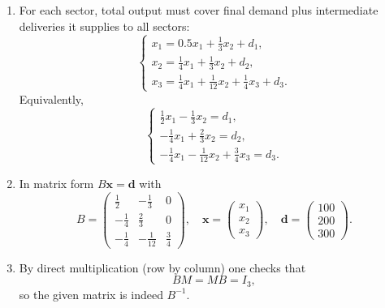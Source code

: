 \documentclass[11pt]{exam}
\begin{document}
\begin{questions}
\begin{solution}[0cm]
\begin{enumerate}[leftmargin = 0.5cm, label = (\alph*), rightmargin = 0.2cm]
    \item For each sector, total output must cover final demand plus intermediate deliveries it supplies to all sectors:
    \[
    \begin{cases}
        x_1 = 0.5x_1 + \tfrac{1}{3}x_2 + d_1, \\[4pt]
        x_2 = \tfrac{1}{4}x_1 + \tfrac{1}{3}x_2 + d_2, \\[4pt]
        x_3 = \tfrac{1}{4}x_1 + \tfrac{1}{12}x_2 + \tfrac{1}{4}x_3 + d_3.
    \end{cases}
    \]
    Equivalently,
    \[
    \begin{cases}
        \tfrac{1}{2}x_1 - \tfrac{1}{3}x_2 = d_1, \\[4pt]
        -\tfrac{1}{4}x_1 + \tfrac{2}{3}x_2 = d_2, \\[4pt]
        -\tfrac{1}{4}x_1 - \tfrac{1}{12}x_2 + \tfrac{3}{4}x_3 = d_3.
    \end{cases}
    \]

    \item In matrix form $B\mathbf{x} = \mathbf{d}$ with
    \[
        B =
        \begin{pmatrix}
            \tfrac{1}{2} & -\tfrac{1}{3} & 0 \\
            -\tfrac{1}{4} & \tfrac{2}{3} & 0 \\
            -\tfrac{1}{4} & -\tfrac{1}{12} & \tfrac{3}{4}
        \end{pmatrix},
        \quad
        \mathbf{x} =
        \begin{pmatrix} x_1 \\ x_2 \\ x_3 \end{pmatrix},
        \quad
        \mathbf{d} =
        \begin{pmatrix} 100 \\ 200 \\ 300 \end{pmatrix}.
    \]

    \item By direct multiplication (row by column) one checks that
    \[
        B M = M B = I_3,
    \]
    so the given matrix is indeed $B^{-1}$.


\end{enumerate}
\end{solution}
\end{questions}
\end{document}
